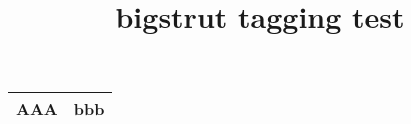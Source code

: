 \documentclass{article}
\title{bigstrut tagging test}
\begin{document}
\setlength{\bigstrutjot}{7pt}
\begin{tabular}{cc}
\hline
AAA & bbb \bigstrut \\
\hline
\end{tabular}
\end{document}
